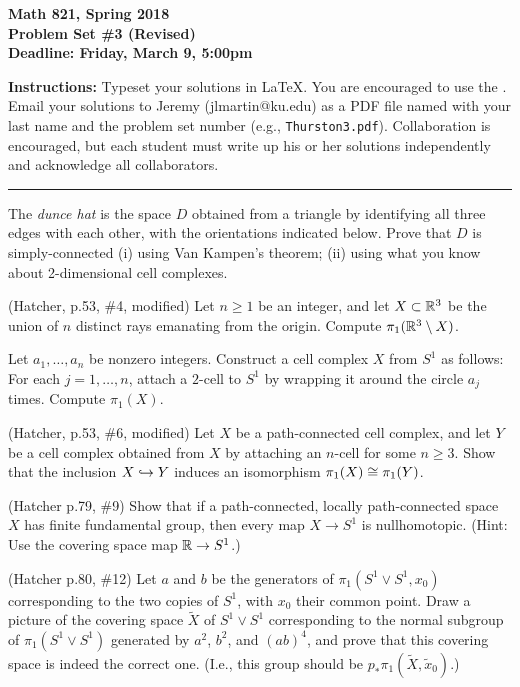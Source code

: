

\thispagestyle{empty}
{\bf Math 821, Spring 2018\\
Problem Set \#3 (Revised)\\
Deadline: Friday, March 9, 5:00pm}

\textbf{Instructions:} Typeset your solutions in LaTeX.  You are encouraged to use the . Email your solutions to Jeremy (jlmartin@ku.edu) as a PDF file named with your last name and the problem set number (e.g., \texttt{Thurston3.pdf}).  Collaboration is encouraged, but each student must write up his or her solutions independently and acknowledge all collaborators.
\medskip
\hrule

\prob The \emph{dunce hat} is the space $D$ obtained from a triangle by identifying all three edges with each other, with the orientations indicated below.  Prove that $D$ is simply-connected (i) using Van Kampen's theorem; (ii) using what you know about 2-dimensional cell complexes.
\begin{center}
\end{center}

\prob (Hatcher, p.53, \#4, modified) Let $n\geq 1$ be an integer, and let $X\subset\mathbb{R}^3$ be the union of $n$ distinct rays emanating from the origin.  Compute $\pi_1(\mathbb{R}^3\setminus X)$.

\prob Let $a_1,\dots,a_n$ be nonzero integers.  Construct a cell complex $X$ from $S^1$ as follows: For each $j=1,\dots,n$, attach a $2$-cell to $S^1$ by wrapping
it around the circle $a_j$ times.  Compute $\pi_1(X)$.

\prob (Hatcher, p.53, \#6, modified) Let $X$ be a path-connected cell complex, and let $Y$ be a cell complex obtained from $X$ by attaching an $n$-cell for some $n\geq 3$.  Show that the inclusion $X\hookrightarrow Y$ induces an isomorphism $\pi_1(X)\cong\pi_1(Y)$.

\prob (Hatcher p.79, \#9) Show that if a path-connected, locally path-connected space $X$ has finite fundamental group, then every map $X\to S^1$ is nullhomotopic.  (Hint: Use the covering space map $\mathbb{R}\to S^1$.)

\prob (Hatcher p.80, \#12) Let $a$ and $b$ be the generators of $\pi_1(S^1\vee S^1,x_0)$ corresponding to the two copies of $S^1$, with $x_0$ their common point.  Draw a picture of the covering space $\tilde X$ of $S^1\vee S^1$ corresponding to the normal subgroup of $\pi_1(S^1\vee S^1)$ generated by $a^2$, $b^2$, and $(ab)^4$, and prove that this covering space is indeed the correct one.  (I.e., this group should be $p_*\pi_1(\tilde X,\tilde x_0)$.) 

